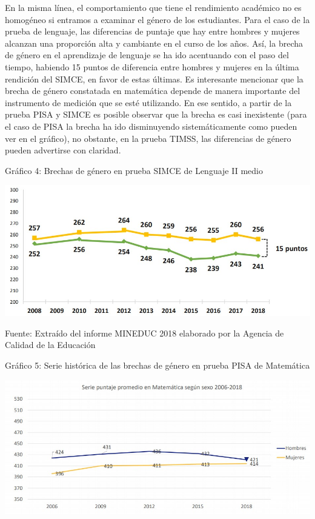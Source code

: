 \documentclass[
]{article}
\begin{document}
En la misma línea, el comportamiento que tiene el rendimiento académico
no es homogéneo si entramos a examinar el género de los estudiantes.
Para el caso de la prueba de lenguaje, las diferencias de puntaje que
hay entre hombres y mujeres alcanzan una proporción alta y cambiante en
el curso de los años. Así, la brecha de género en el aprendizaje de
lenguaje se ha ido acentuando con el paso del tiempo, habiendo 15 puntos
de diferencia entre hombres y mujeres en la última rendición del SIMCE,
en favor de estas últimas. Es interesante mencionar que la brecha de
género constatada en matemática depende de manera importante del
instrumento de medición que se esté utilizando. En ese sentido, a partir
de la prueba PISA y SIMCE es posible observar que la brecha es casi
inexistente (para el caso de PISA la brecha ha ido disminuyendo
sistemáticamente como pueden ver en el gráfico), no obstante, en la
prueba TIMSS, las diferencias de género pueden advertirse con claridad.

Gráfico 4: Brechas de género en prueba SIMCE de Lenguaje II medio

\includegraphics{input/images/brecha_gen_leng.jpg}

Fuente: Extraído del informe MINEDUC 2018 elaborado por la Agencia de
Calidad de la Educación

Gráfico 5: Serie histórica de las brechas de género en prueba PISA de
Matemática

\includegraphics{input/images/brecha_gen_mate_pisa.jpg}
\end{document}
